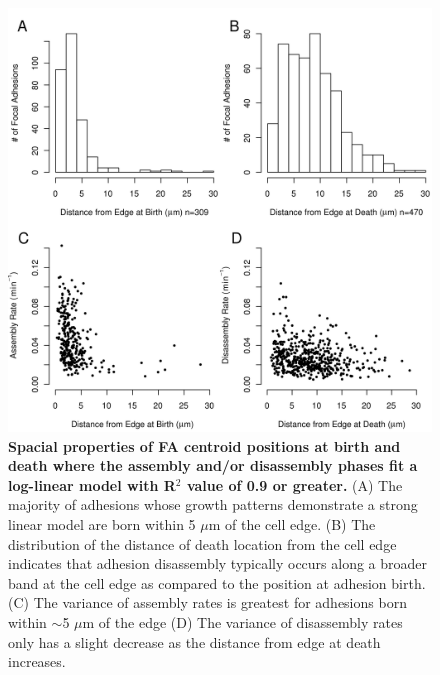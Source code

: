 \begin{figure}[htbp]
\begin{center}
\includegraphics[width=\textwidth]{../figures/spatial/spatial}
\end{center}
\caption{
{\bf Spacial properties of FA centroid positions at birth and death where the
assembly and/or disassembly phases fit a log-linear model with R$^2$ value of
0.9 or greater.} (A) The majority of adhesions whose growth patterns demonstrate
a strong linear model are born within 5 $\mu$m of the cell edge. (B) The
distribution of the distance of death location from the cell edge indicates that
adhesion disassembly typically occurs along a broader band at the cell edge as
compared to the position at adhesion birth. (C) The variance of assembly rates
is greatest for adhesions born within $\sim$5 $\mu$m of the edge (D) The
variance of disassembly rates only has a slight decrease as the distance from
edge at death increases.  
}
\label{spatial}
\end{figure}

